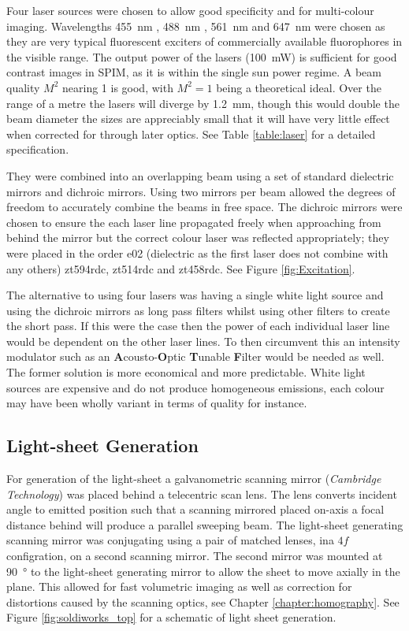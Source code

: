 Four %
laser sources were chosen to allow good specificity and for multi-colour imaging.
Wavelengths \textcolor{455nm}{\SI{455}{\nano\meter}} , \textcolor{488nm}{\SI{488}{\nano\meter}} , \textcolor{561nm}{\SI{561}{\nano\meter}} and \textcolor{647nm}{\SI{647}{\nano\meter}} were chosen as they are very typical fluorescent exciters of commercially available fluorophores in the visible range.
The output power of the lasers (\SI{100}{\milli\watt}) is sufficient for good contrast images in SPIM, as it is within the single sun power regime.
A beam quality $M^2$ nearing 1 is good, with $M^2 = 1$ being a theoretical ideal.
Over the range of a metre the lasers will diverge by \SI{1.2}{\milli\meter}, though this would double the beam diameter the sizes are appreciably small that it will have very little effect when corrected for through later optics.
See Table \ref{table:laser} for a detailed specification.

They were combined into an overlapping beam using a set of standard dielectric mirrors and dichroic mirrors.
Using two mirrors per beam allowed the degrees of freedom to accurately combine the beams in free space.
The dichroic mirrors were chosen to ensure the each laser line propagated freely when approaching from behind the mirror but the correct colour laser was reflected appropriately; they were placed in the order e02 (dielectric as the first laser does not combine with any others) zt594rdc, zt514rdc and zt458rdc.
See Figure \ref{fig:Excitation}.

The alternative to using four lasers was having a single white light source and using the dichroic mirrors as long pass filters whilst using other filters to create the short pass.
If this were the case then the power of each individual laser line would be dependent on the other laser lines.
To then circumvent this an intensity modulator such as an \textbf{A}cousto-\textbf{O}ptic \textbf{T}unable \textbf{F}ilter would be needed as well.
The former solution is more economical and more predictable.
White light sources are expensive and do not produce homogeneous emissions, each colour may have been wholly variant in terms of quality for instance.

\subsection{Light-sheet Generation}

For generation of the light-sheet a galvanometric scanning mirror (\emph{Cambridge Technology}) was placed behind a telecentric  scan lens.
The lens converts incident angle to emitted position such that a scanning mirrored placed on-axis a focal distance behind will produce a parallel sweeping beam.
The light-sheet generating scanning mirror was conjugating using a pair of matched lenses, ina $4f$ configration, on a second scanning mirror.
The second mirror was mounted at \SI{90}{\degree} to the light-sheet generating mirror to allow the sheet to move axially in the plane.
This allowed for fast volumetric imaging as well as correction for distortions caused by the scanning optics, see Chapter \ref{chapter:homography}.
See Figure \ref{fig:soldiworks_top} for a schematic of light sheet generation.

